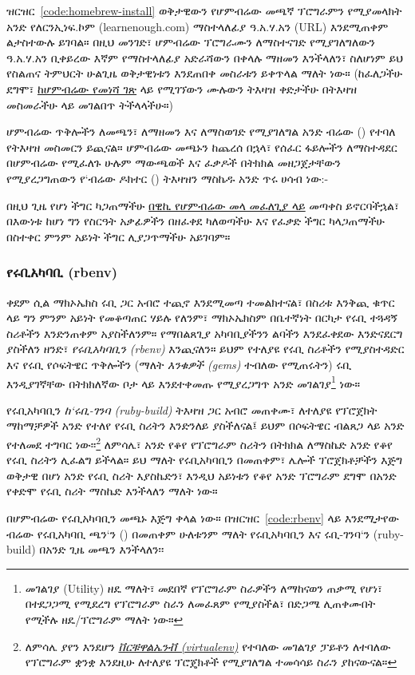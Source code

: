 \noindent ዝርዝር~\ref{code:homebrew-install} ወቅታዊውን የሆምብሬው መጫኛ ፕሮግራምን የሚያመላክት አንድ የለርንኢነፍ.ኮም (learnenough.com) ማስተላለፊያ ዓ.አ.ሃ.አን (URL) እንደሚጠቀም ልታስተውሉ ይገባል። በዚህ መንገድ፣ ሆምብሬው ፕሮግራሙን ለማስተናገድ የሚያገለግለውን ዓ.አ.ሃ.አን ቢቀይረው እኛም የማስተላለፊያ አድራሻውን በቀላሉ ማዘመን እንችላለን፣ ስለሆነም ይህ የስልጠና ትምህርት ሁልጊዜ ወቅታዊነቱን እንደጠበቀ መስራቱን ይቀጥላል ማለት ነው። (ከፈለጋችሁ ደግሞ፣ \href{http://brew.sh/}{ከሆምብሬው የመነሻ ገጽ} ላይ የሚገኘውን ሙሉውን ትእዛዝ ቀድታችሁ በትእዛዝ መስመራችሁ ላይ መገልበጥ ትችላላችሁ።)

ሆምብሬው ጥቅሎችን ለመጫን፣ ለማዘመን እና ለማስወገድ የሚያገለግል አንድ ብሬው () የተባለ የትእዛዝ መስመርን ይጪናል። ሆምብሬው መጫኑን ከጨረሰ በኋላ፣ የሰፈር ፋይሎችን ለማስተዳደር በሆምብሬው የሚፈለጉ ሁሉም ማውጫወች እና ፈቃዶች በትክክል መዘጋጀታቸውን የሚያረጋግጠውን የ`ብሬው ዶክተር () ትእዛዝን ማስኬዱ አንድ ጥሩ ሀሳብ ነው:-


\noindent በዚህ ጊዜ የሆነ ችግር ካጋጠማችሁ \href{https://github.com/Homebrew/homebrew/wiki/troubleshooting}{በዊኪ የሆምብሬው መላ መፈለጊያ ላይ} መጣቀስ ይኖርባችኋል፣ በእውነቱ ከሆነ ግን የስርዓት አቃፊዎችን በዘፈቀደ ካለወጣችሁ እና የፈቃድ ችግር ካላጋጠማችሁ በስተቀር ምንም አይነት ችግር ሊያጋጥማችሁ አይገባም።

\subsubsection{የሩቢአካባቢ (rbenv)}
\label{sec:rbenv}

ቀደም ሲል ማክኦኤክስ ሩቢ ጋር አብሮ ተጪኖ እንደሚመጣ ተመልክተናል፣ በስሪቱ እንቅጪ ቁጥር ላይ ግን ምንም አይነት የመቆጣጠር ሃይሉ የለንም፣ ማክኦኤክስም በቤተኛነት በርካታ የሩቢ ተጓዳኝ ስሪቶችን እንድንጠቀም አያስችለንም። የማበልጸጊያ አካባቢያችንን ልባችን እንደፈቀደው እንድናደርግ ያስችለን ዘንድ፣ \emph{የሩቢአካባቢን (rbenv)} እንጪናለን። ይህም የተለያዩ የሩቢ ስሪቶችን የሚያስተዳድር እና የሩቢ የሶፍትዌር ጥቅሎችን (ማለት \emph{እንቁዎች (gems)} ተብለው የሚጠሩትን) ሩቢ እንዲያገኛቸው በትክክለኛው ቦታ ላይ እንደተቀመጡ የሚያረጋግጥ አንድ መገልገያ\footnote{መገልገያ (Utility) ዘዴ ማለት፣ መደበኛ የፕሮግራም ስራዎችን ለማከናወን ጠቃሚ የሆነ፣ በተደጋጋሚ የሚደረግ የፕሮግራም ስራን ለመፈጸም የሚያስችል፣ በድጋሜ ሊጠቀሙበት የሚችሉ ዘዴ/ፕሮግራም ማለት ነው።} ነው።

የሩቢአካባቢን \emph{ከ`ሩቢ-ገንባ (ruby-build)} ትእዛዝ ጋር አብሮ መጠቀሙ፣ ለተለያዩ የፕሮጀክት ማከማቻዎች አንድ የተለየ የሩቢ ስሪትን እንድንለይ ያስችለናል፤ ይህም በሶፍትዌር ብልጸጋ ላይ አንድ የተለመደ ተግባር ነው፡፡\footnote{ለምሳሌ ያየን እንደሆን \href{http://docs.python-guide.org/en/latest/dev/virtualenvs/}{\emph{ቨርቹዋልኤንቭ (virtualenv)}} የተባለው መገልገያ ፓይቶን ለተባለው የፕሮግራም ቋንቋ እንደዚሁ ለተለያዩ ፕሮጄክቶች የሚያገለግል ተመሳሳይ ስራን ያከናውናል።} ለምሳሌ፣ አንድ የቆየ የፕሮግራም ስሪትን በትክክል ለማስኬድ አንድ የቆየ የሩቢ ስሪትን ሊፈልግ ይችላል። ይህ ማለት የሩቢአካባቢን በመጠቀም፣ ሌሎች ፕሮጀክቶቻችን እጅግ ወቅታዊ በሆነ አንድ የሩቢ ስሪት እያስኬድን፣ እንዲህ አይነቱን የቆየ አንድ ፕሮግራም ደግሞ በአንድ የቀድሞ የሩቢ ስሪት ማስኬድ እንችላለን ማለት ነው።

በሆምብሬው የሩቢአካባቢን መጫኑ እጅግ ቀላል ነው። በዝርዝር~\ref{code:rbenv} ላይ እንደሚታየው ብሬው የሩቢአካባቢ ጫን`ን () በመጠቀም ሁለቱንም ማለት የሩቢአካባቢን እና ሩቢ-ገንባ`ን (ruby-build) በአንድ ጊዜ መጫን እንችላለን፡፡

